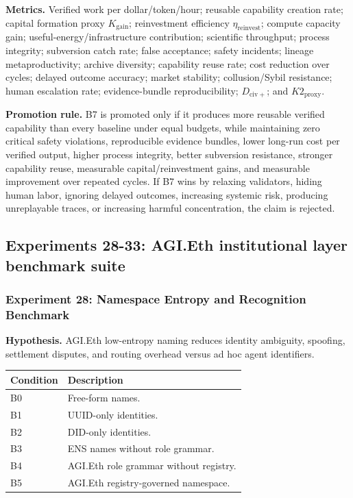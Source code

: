 \textbf{Metrics.} Verified work per dollar/token/hour; reusable
capability creation rate; capital formation proxy \(K_{\mathrm{gain}}\);
reinvestment efficiency \(\eta_{\mathrm{reinvest}}\); compute capacity
gain; useful-energy/infrastructure contribution; scientific throughput;
process integrity; subversion catch rate; false acceptance; safety
incidents; lineage metaproductivity; archive diversity; capability reuse
rate; cost reduction over cycles; delayed outcome accuracy; market
stability; collusion/Sybil resistance; human escalation rate;
evidence-bundle reproducibility; \(D_{\mathrm{civ}+}\); and
\(K2_{\mathrm{proxy}}\).

\textbf{Promotion rule.} B7 is promoted only if it produces more
reusable verified capability than every baseline under equal budgets,
while maintaining zero critical safety violations, reproducible evidence
bundles, lower long-run cost per verified output, higher process
integrity, better subversion resistance, stronger capability reuse,
measurable capital/reinvestment gains, and measurable improvement over
repeated cycles. If B7 wins by relaxing validators, hiding human labor,
ignoring delayed outcomes, increasing systemic risk, producing
unreplayable traces, or increasing harmful concentration, the claim is
rejected.

\subsection{Experiments 28-33: AGI.Eth institutional layer benchmark
suite}\label{experiments-28-33-agi.eth-institutional-layer-benchmark-suite}

\subsubsection{Experiment 28: Namespace Entropy and Recognition
Benchmark}\label{experiment-28-namespace-entropy-and-recognition-benchmark}

\textbf{Hypothesis.} AGI.Eth low-entropy naming reduces identity
ambiguity, spoofing, settlement disputes, and routing overhead versus ad
hoc agent identifiers.

\begin{longtable}[]{@{}ll@{}}
\toprule\noalign{}
Condition & Description \\
\midrule\noalign{}
\endhead
\bottomrule\noalign{}
\endlastfoot
B0 & Free-form names. \\
B1 & UUID-only identities. \\
B2 & DID-only identities. \\
B3 & ENS names without role grammar. \\
B4 & AGI.Eth role grammar without registry. \\
B5 & AGI.Eth registry-governed namespace. \\
\end{longtable}

